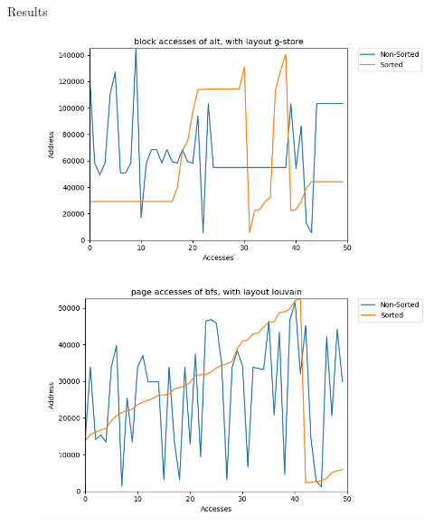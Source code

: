\documentclass[rgb]{beamer}
\begin{document}
\begin{frame}[allowframebreaks]{Results}
            \framebreak
            \begin{figure}
                \begin{center}
                \includegraphics[keepaspectratio, height=0.8\textheight, width=\textwidth]{img/dblp_g-store_alt_block_sil_access_seq.png}
                \end{center}
            \end{figure}
            
            \framebreak
            \begin{figure}
                \begin{center}
                \includegraphics[keepaspectratio, height=0.8\textheight, width=\textwidth]{img/youtube_louvain_bfs_page_sil_access_seq.png}
                \end{center}
            \end{figure}
            

\end{frame}
\end{document}
